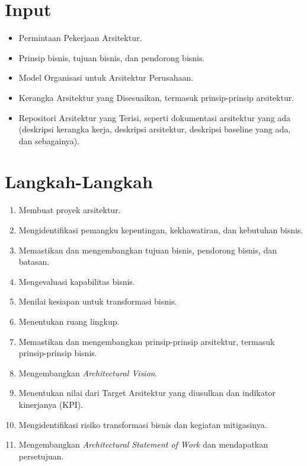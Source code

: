 \section{Input}
\begin{itemize}
	\item Permintaan Pekerjaan Arsitektur.
	\item Prinsip bisnis, tujuan bisnis, dan pendorong bisnis.
	\item Model Organisasi untuk Arsitektur Perusahaan.
	\item Kerangka Arsitektur yang Disesuaikan, termasuk prinsip-prinsip arsitektur.
	\item Repositori Arsitektur yang Terisi, seperti dokumentasi arsitektur yang ada (deskripsi kerangka kerja, deskripsi arsitektur, deskripsi baseline yang ada, dan sebagainya).
\end{itemize}

\section{Langkah-Langkah}
\begin{enumerate}
	\item Membuat proyek arsitektur.
	\item Mengidentifikasi pemangku kepentingan, kekhawatiran, dan kebutuhan bisnis.
	\item Memastikan dan mengembangkan tujuan bisnis, pendorong bisnis, dan batasan.
	\item Mengevaluasi kapabilitas bisnis.
	\item Menilai kesiapan untuk transformasi bisnis.
	\item Menentukan ruang lingkup.
	\item Memastikan dan mengembangkan prinsip-prinsip arsitektur, termasuk prinsip-prinsip bisnis.
	\item Mengembangkan \textit{Architectural Vision}.
	\item Menentukan nilai dari Target Arsitektur yang diusulkan dan indikator kinerjanya (KPI).
	\item Mengidentifikasi risiko transformasi bisnis dan kegiatan mitigasinya.
	\item Mengembangkan \textit{Architectural Statement of Work} dan mendapatkan persetujuan.
\end{enumerate}

